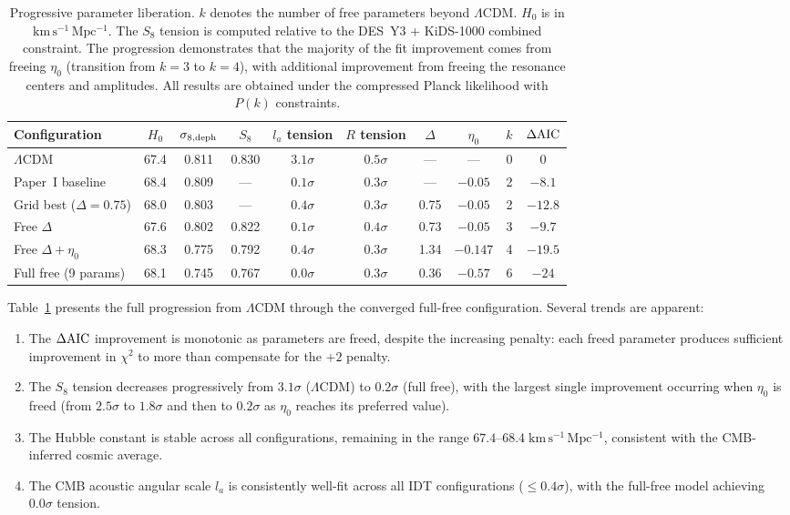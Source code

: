 \documentclass[aps,prd,twocolumn,superscriptaddress,nofootinbib]{revtex4-2}
\newcommand{\Hubble}{H_0}
\newcommand{\dAIC}{\Delta{\rm AIC}}
\newcommand{\etaz}{\eta_0}
\begin{document}
\begin{table}[t]
\centering
\caption{Progressive parameter liberation. $k$ denotes the number of
  free parameters beyond $\Lambda$CDM. $\Hubble$ is in
  $\mathrm{km\,s^{-1}\,Mpc^{-1}}$. The $S_8$ tension is computed
  relative to the DES~Y3 + KiDS-1000 combined constraint. The
  progression demonstrates that the majority of the fit improvement
  comes from freeing $\etaz$ (transition from $k=3$ to $k=4$), with
  additional improvement from freeing the resonance centers and
  amplitudes. All results are obtained under the compressed Planck
  likelihood with $P(k)$ constraints.}
\label{tab:progression}
\begin{ruledtabular}
\begin{tabular}{lccccccccc}
Configuration & $\Hubble$ & $\sigma_{8,\rm deph}$ & $S_8$ &
$l_a$ tension & $R$ tension & $\Delta$ & $\etaz$ & $k$ & $\dAIC$ \\
\hline
$\Lambda$CDM & 67.4 & 0.811 & 0.830 & $3.1\sigma$ & $0.5\sigma$ &
--- & --- & 0 & 0 \\
Paper~I baseline & 68.4 & 0.809 & --- & $0.1\sigma$ & $0.3\sigma$ &
--- & $-0.05$ & 2 & $-8.1$ \\
Grid best ($\Delta = 0.75$) & 68.0 & 0.803 & --- & $0.4\sigma$ &
$0.3\sigma$ & 0.75 & $-0.05$ & 2 & $-12.8$ \\
Free $\Delta$ & 67.6 & 0.802 & 0.822 & $0.1\sigma$ & $0.4\sigma$ &
0.73 & $-0.05$ & 3 & $-9.7$ \\
Free $\Delta + \etaz$ & 68.3 & 0.775 & 0.792 & $0.4\sigma$ &
$0.3\sigma$ & 1.34 & $-0.147$ & 4 & $-19.5$ \\
Full free (9 params) & 68.1 & 0.745 & 0.767 & $0.0\sigma$ &
$0.3\sigma$ & 0.36 & $-0.57$ & 6 & $-24$ \\
\end{tabular}
\end{ruledtabular}
\end{table}

Table~\ref{tab:progression} presents the full progression from
$\Lambda$CDM through the converged full-free configuration. Several
trends are apparent:

\begin{enumerate}
\item The $\dAIC$ improvement is monotonic as parameters are freed,
  despite the increasing penalty: each freed parameter produces
  sufficient improvement in $\chi^2$ to more than compensate for the
  $+2$ penalty.
\item The $S_8$ tension decreases progressively from $3.1\sigma$
  ($\Lambda$CDM) to $0.2\sigma$ (full free), with the largest single
  improvement occurring when $\etaz$ is freed (from $2.5\sigma$ to
  $1.8\sigma$ and then to $0.2\sigma$ as $\etaz$ reaches its preferred
  value).
\item The Hubble constant is stable across all configurations,
  remaining in the range $67.4$--$68.4\;\mathrm{km\,s^{-1}\,Mpc^{-1}}$,
  consistent with the CMB-inferred cosmic average.
\item The CMB acoustic angular scale $l_a$ is consistently well-fit
  across all IDT configurations ($\leq 0.4\sigma$), with the full-free
  model achieving $0.0\sigma$ tension.
\end{enumerate}
\end{document}
